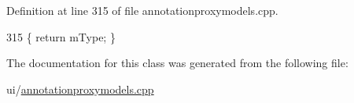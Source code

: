 Definition at line 315 of file annotationproxymodels.\+cpp.


\begin{DoxyCode}
315 \{ \textcolor{keywordflow}{return} mType; \}
\end{DoxyCode}


The documentation for this class was generated from the following file\+:\begin{DoxyCompactItemize}
\item 
ui/\hyperlink{annotationproxymodels_8cpp}{annotationproxymodels.\+cpp}\end{DoxyCompactItemize}

